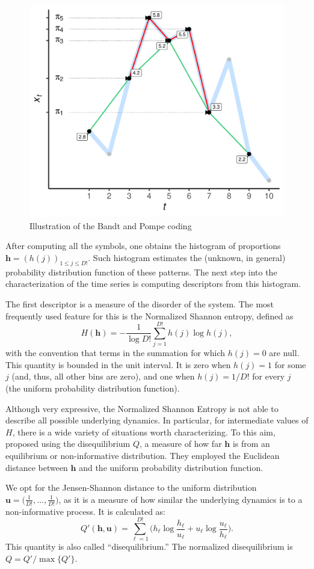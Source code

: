 \documentclass[12pt]{article}
\begin{document}
\begin{figure}[hbt]
	\centering
	\includegraphics[width=.7\linewidth]{IntroBP}
	\caption{Illustration of the Bandt and Pompe coding}
	\label{Fig:IntroBP}
\end{figure}

After computing all the symbols, one obtains the histogram of proportions $\bm h = (h(j))_{1\leq j\leq D!}$.
Such histogram estimates the (unknown, in general) probability distribution function of these patterns.
The next step into the characterization of the time series is computing descriptors from this histogram.

The first descriptor is a measure of the disorder of the system.
The most frequently used feature for this is the Normalized Shannon entropy, defined as
\begin{equation}
	H(\bm h) = -\frac{1}{\log D!} \sum_{j=1}^{D!} h(j) \log h(j),
\end{equation}
with the convention that terms in the summation for which $h(j)=0$ are null.
This quantity is bounded in the unit interval. 
It is zero when $h(j)=1$ for some $j$ (and, thus, all other bins are zero), and one when $h(j)=1/D!$ for every $j$ (the uniform probability distribution function).

Although very expressive, the Normalized Shannon Entropy is not able to describe all possible underlying dynamics.
In particular, for intermediate values of $H$, there is a wide variety of situations worth characterizing.
To this aim, \citet{LopezRuiz1995} proposed using the disequilibrium  $Q$, a measure of how far $\bm h$ is from an equilibrium or non-informative distribution.
They employed the Euclidean distance between $\bm h$ and the uniform probability distribution function.

We opt for the Jensen-Shannon distance to the uniform distribution $\bm{u} = \big(\frac{1}{D!}, \dots, \frac{1}{D!}\big)$, as it is a measure of how similar the underlying dynamics is to a non-informative process.
It is calculated as:
\begin{equation}
	Q'(\bm{h}, \bm{u}) = \sum_{\ell=1}^{D!} \Big(h_\ell \log\frac{h_\ell}{u_\ell} +
	u_\ell \log\frac{u_\ell}{h_\ell}
	\Big).
\end{equation}
This quantity is also called ``disequilibrium.''
The normalized disequilibrium is $ Q=Q'/\max\{Q'\}$.
\end{document}
